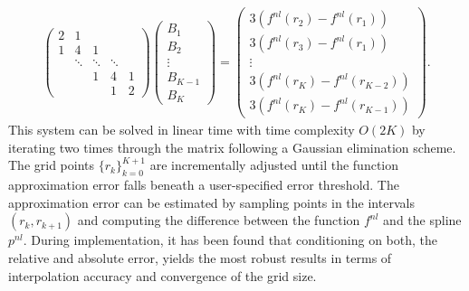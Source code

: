 \begin{subequations}
\begin{align}
\begin{pmatrix}
    2 & 1       &           &       &    \\
    1 & 4       & 1         &           &    \\
      & \ddots  & \ddots    & \ddots    &           \\
      &         & 1         &     4     & 1   \\
      &         &           &     1     & 2
\end{pmatrix}
\begin{pmatrix}
B_1\\
B_2\\
\vdots\\
B_{K-1}\\
B_{K}
\end{pmatrix}
=
\begin{pmatrix}
3(f^{nl}(r_2)-f^{nl}(r_1))\\
3(f^{nl}(r_3)-f^{nl}(r_1))\\
\vdots\\
3(f^{nl}(r_K)-f^{nl}(r_{K-2}))\\
3(f^{nl}(r_K)-f^{nl}(r_{K-1}))
\end{pmatrix}.
\end{align}
\end{subequations}
This system can be solved in linear time with time complexity $O(2K)$ by iterating two times through the matrix following a Gaussian elimination scheme.
%    
The grid points $\{r_k\}_{k=0}^{K+1}$ are incrementally adjusted until the function approximation error falls beneath a user-specified error threshold.
The approximation error can be estimated by sampling points in the intervals $(r_k, r_{k+1})$ and computing the difference between the function $f^{nl}$ and the spline $p^{nl}$.
During implementation, it has been found that conditioning on both, the relative and absolute error, yields the most robust results in terms of interpolation accuracy and convergence of the grid size.

